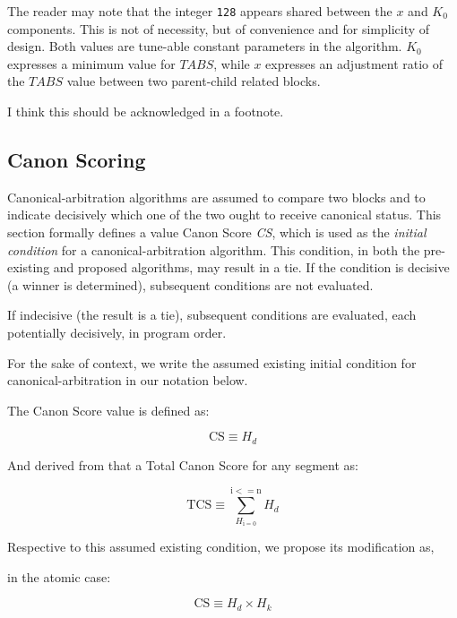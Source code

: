 \documentclass[11pt]{article}
\theoremstyle{plain}
\begin{document}
The reader may note that the integer \texttt{128} appears shared between the
$x$ and $K_0$ components.
This is not of necessity, but of convenience and for simplicity of design.
Both values are tune-able constant parameters in the algorithm.
$K_0$ expresses a minimum value for $TABS$, while $x$ expresses an adjustment
ratio of the $TABS$ value between two parent-child related blocks.

I think this should be acknowledged in a footnote.

\subsection{\small{Canon Scoring}}

Canonical-arbitration algorithms are assumed to compare two blocks and to
indicate decisively which one of the two ought to receive canonical status.
This section formally defines a value Canon Score \textit{CS}, which is used as
the \textit{initial condition} for a canonical-arbitration algorithm.
This condition, in both the pre-existing and proposed algorithms, may result in
a tie. If the condition is decisive (a winner is determined), subsequent
conditions are not evaluated.

If indecisive (the result is a tie), subsequent conditions are evaluated, each
potentially decisively, in program order.

For the sake of context, we write the assumed existing initial condition for
canonical-arbitration in our notation below.

The Canon Score value is defined as:

\begin{equation}
\mathrm{CS} \equiv H_d
\end{equation}

And derived from that a Total Canon Score for any segment as:

\begin{equation}
\mathrm{TCS} \equiv \sum_{H_\mathrm{i = 0}}^{\mathrm{i <= n}} H_d
\end{equation}

Respective to this assumed existing condition, we propose its modification as,

in the atomic case:

\begin{equation}
\mathrm{CS} \equiv H_d \times H_k
\end{equation}
\end{document}

